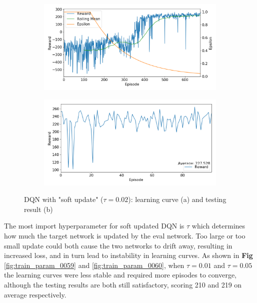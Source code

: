 \documentclass[10pt]{article}
\begin{document}
\begin{figure}[H]
  \centering
  \begin{subfigure}[b]{0.49\linewidth}
  \centering
  \includegraphics[width=\linewidth]{../logs/train_param_0058.png}
      \caption{}
  \label{fig:train_param_0058}
  \end{subfigure}
  \begin{subfigure}[b]{0.49\linewidth}
  \centering
  \includegraphics[width=\linewidth]{../logs/test_param_0058.png}
      \caption{}
  \label{fig:test_param_0058}
  \end{subfigure}
  \caption{DQN with "soft update" ($\tau=0.02$): learning curve (a) and testing result (b)}
  \label{fig:param_0058}
\end{figure}

The most import hyperparameter for soft updated DQN is $\tau$ which determines how much the target network is updated by the eval network. Too large or too small update could both cause the two networks to drift away, resulting in increased loss, and in turn lead to instability in learning curves. As shown in \textbf{Fig} \ref{fig:train_param_0059} and \ref{fig:train_param_0060}, when $\tau=0.01$ and $\tau=0.05$ the learning curves were less stable and required more episodes to converge, although the testing results are both still satisfactory, scoring 210 and 219 on average respectively.
\end{document}
